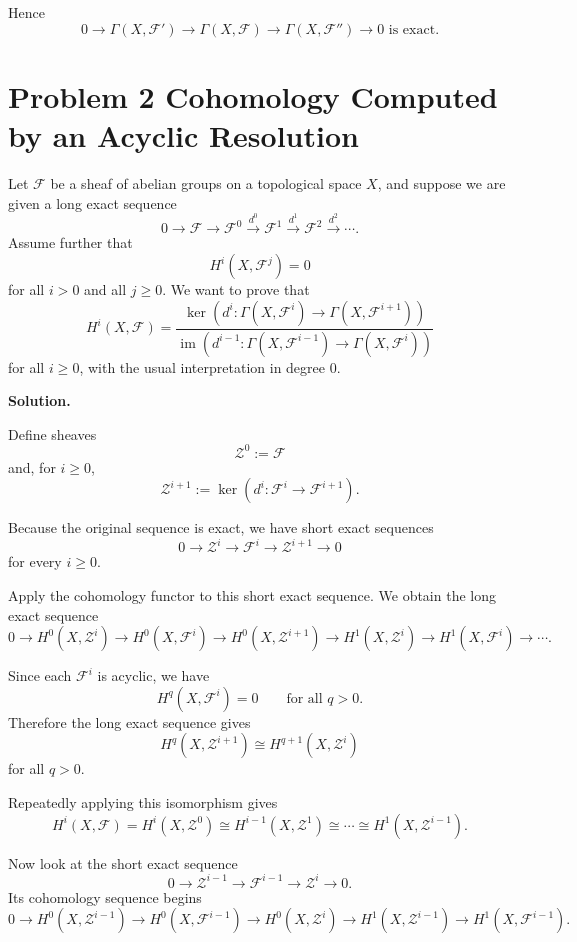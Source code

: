\documentclass[12pt,a4paper]{article}
\theoremstyle{notespace}
\begin{document}
Hence
\[
\boxed{
	0\to \Gamma(X,\mathcal F')
	\to \Gamma(X,\mathcal F)
	\to \Gamma(X,\mathcal F'')
	\to 0
	\text{ is exact.}
}
\]

\section{Problem 2 Cohomology Computed by an Acyclic Resolution}

Let \(\mathcal F\) be a sheaf of abelian groups on a topological space \(X\), and suppose we are given a long exact sequence
\[
0\longrightarrow \mathcal F
\longrightarrow \mathcal F^0
\xrightarrow{d^0}
\mathcal F^1
\xrightarrow{d^1}
\mathcal F^2
\xrightarrow{d^2}
\cdots .
\]
Assume further that
\[
H^i(X,\mathcal F^j)=0
\]
for all \(i>0\) and all \(j\geq 0\). We want to prove that
\[
H^i(X,\mathcal F)
=
\frac{
	\ker\left(
	d^i:\Gamma(X,\mathcal F^i)\to \Gamma(X,\mathcal F^{i+1})
	\right)
}{
	\operatorname{im}\left(
	d^{i-1}:\Gamma(X,\mathcal F^{i-1})\to \Gamma(X,\mathcal F^i)
	\right)
}
\]
for all \(i\geq 0\), with the usual interpretation in degree \(0\).

\textbf{Solution.}

Define sheaves
\[
\mathcal Z^0:=\mathcal F
\]
and, for \(i\geq 0\),
\[
\mathcal Z^{i+1}:=\ker(d^i:\mathcal F^i\to \mathcal F^{i+1}).
\]

Because the original sequence is exact, we have short exact sequences
\[
0\longrightarrow \mathcal Z^i
\longrightarrow \mathcal F^i
\longrightarrow \mathcal Z^{i+1}
\longrightarrow 0
\]
for every \(i\geq 0\).

Apply the cohomology functor to this short exact sequence. We obtain the long exact sequence
\[
0\to H^0(X,\mathcal Z^i)
\to H^0(X,\mathcal F^i)
\to H^0(X,\mathcal Z^{i+1})
\to H^1(X,\mathcal Z^i)
\to H^1(X,\mathcal F^i)
\to \cdots .
\]

Since each \(\mathcal F^i\) is acyclic, we have
\[
H^q(X,\mathcal F^i)=0
\qquad\text{for all }q>0.
\]
Therefore the long exact sequence gives
\[
H^q(X,\mathcal Z^{i+1})
\cong
H^{q+1}(X,\mathcal Z^i)
\]
for all \(q>0\).

Repeatedly applying this isomorphism gives
\[
H^i(X,\mathcal F)
=
H^i(X,\mathcal Z^0)
\cong
H^{i-1}(X,\mathcal Z^1)
\cong
\cdots
\cong
H^1(X,\mathcal Z^{i-1}).
\]

Now look at the short exact sequence
\[
0\longrightarrow \mathcal Z^{i-1}
\longrightarrow \mathcal F^{i-1}
\longrightarrow \mathcal Z^i
\longrightarrow 0.
\]
Its cohomology sequence begins
\[
0\to H^0(X,\mathcal Z^{i-1})
\to H^0(X,\mathcal F^{i-1})
\to H^0(X,\mathcal Z^i)
\to H^1(X,\mathcal Z^{i-1})
\to H^1(X,\mathcal F^{i-1}).
\]
\end{document}
